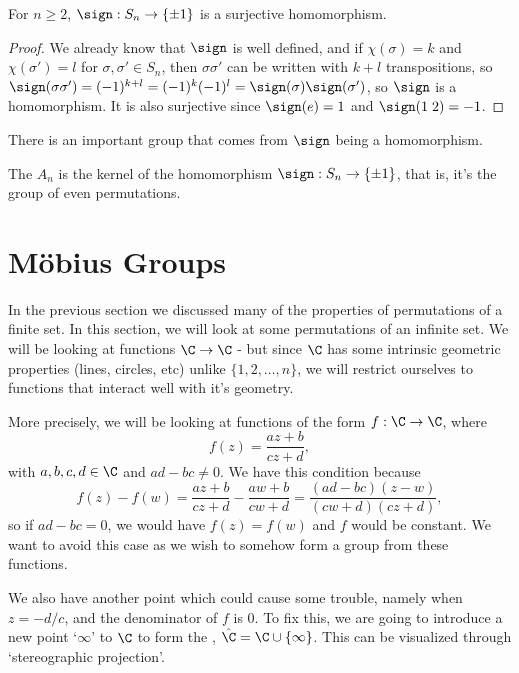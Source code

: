 \documentclass[a4]{scrreprt}
\begin{document}
\begin{proposition}
	For $n \geq 2$, $\sign : S_n \rightarrow \{\pm 1\}$ is a surjective homomorphism.
\end{proposition}
\begin{proof}
	We already know that $\sign$ is well defined, and if $\chi(\sigma) = k$ and $\chi(\sigma') = l$ for $\sigma, \sigma' \in S_n$, then $\sigma \sigma'$ can be written with $k + l$ transpositions, so $\sign(\sigma \sigma') = (-1)^{k + l} = (-1)^k (-1)^l = \sign(\sigma) \sign(\sigma')$, so $\sign$ is a homomorphism. It is also surjective since $\sign(e) = 1$ and $\sign(1\; 2) = -1$.
\end{proof}

There is an important group that comes from $\sign$ being a homomorphism.

\begin{definition}
	The  $A_n$ is the kernel of the homomorphism $\sign : S_n \rightarrow \{ \pm 1\}$, that is, it's the group of even permutations.
\end{definition}


\section{Möbius Groups}

In the previous section we discussed many of the properties of permutations of a finite set. In this section, we will look at some permutations of an infinite set. We will be looking at functions $\C \rightarrow \C$ - but since $\C$ has some intrinsic geometric properties (lines, circles, etc) unlike $\{1, 2, \dots, n\}$, we will restrict ourselves to functions that interact well with it's geometry.

More precisely, we will be looking at functions of the form $f: \C \rightarrow \C$, where
$$
f(z) = \frac{az + b}{cz + d},
$$
with $a, b, c, d \in \C$ and $ad - bc \neq 0$. We have this condition because 
$$
f(z) - f(w) = \frac{az + b}{cz + d} - \frac{aw + b}{cw + d} = \frac{(ad - bc)(z - w)}{(cw + d)(cz + d)},
$$
so if $ad - bc = 0$, we would have $f(z) = f(w)$ and $f$ would be constant. We want to avoid this case as we wish to somehow form a group from these functions. 

We also have another point which could cause some trouble, namely when $z = -d/c$, and the denominator of $f$ is 0. To fix this, we are going to introduce a new point `$\infty$' to $\C$ to form the , $\hat{\C} = \C \cup \{ \infty \}$.  This can be visualized through `stereographic projection'.
\end{document}
